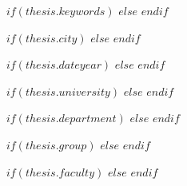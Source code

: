 {} %
\examiner{} %
{} %
\author{$author$} %
\addresses{} %

\subject{} %

$if(thesis.keywords)$
$else$\keywords{}
$endif$

$if(thesis.city)$
$else$\city{}
$endif$

$if(thesis.dateyear)$
$else$\dateyear{}
$endif$

$if(thesis.university)$
$else$\university{}
$endif$

$if(thesis.department)$
$else$\department{}
$endif$

$if(thesis.group)$
$else$\group{}
$endif$

$if(thesis.faculty)$
$else$
\faculty{}
$endif$

\setcounter{tocdepth}{$if(toc-depth)$$toc-depth$$else$3$endif$} %
